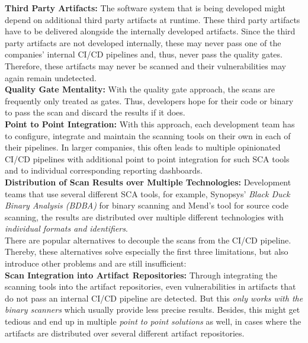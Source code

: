 \noindent\textbf{Third Party Artifacts:} The software system that is being developed might depend on additional third party artifacts at runtime. These third party artifacts have to be delivered alongside the internally developed artifacts. Since the third party artifacts are not developed internally, these may never pass one of the companies' internal CI/CD pipelines and, thus, never pass the quality gates. Therefore, these artifacts may never be scanned and their vulnerabilities may again remain undetected.\\

\noindent\textbf{Quality Gate Mentality:} With the quality gate approach, the scans are frequently only treated as gates. Thus, developers hope for their code or binary to pass the scan and discard the results if it does.\\
 
\noindent\textbf{Point to Point Integration:} With this approach, each development team has to configure, integrate and maintain the scanning tools on their own in each of their pipelines. In larger companies, this often leads to multiple opinionated CI/CD pipelines with additional point to point integration for such SCA tools and to individual corresponding reporting dashboards.\\

\noindent\textbf{Distribution of Scan Results over Multiple Technologies:} Development teams that use several different SCA tools, for example, Synopsys' \emph{Black Duck Binary Analysis (BDBA)} for binary scanning and Mend's tool for source code scanning, the results are distributed over multiple different technologies with \emph{individual formats and identifiers}.\\

\noindent There are popular alternatives to decouple the scans from the CI/CD pipeline. Thereby, these alternatives solve especially the first three limitations, but also introduce other problems and are still insufficient:\\

\noindent\textbf{Scan Integration into Artifact Repositories:} Through integrating the scanning tools into the artifact repositories, even vulnerabilities in artifacts that do not pass an internal CI/CD pipeline are detected. But this \emph{only works with the binary scanners} which usually provide less precise results. Besides, this might get tedious and end up in multiple \emph{point to point solutions} as well, in cases where the artifacts are distributed over several different artifact repositories.\\

